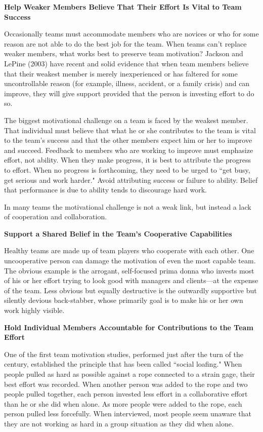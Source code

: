 \textbf{Help Weaker Members Believe That Their Effort Is Vital to Team Success}

Occasionally teams must accommodate members who are novices or who for some reason are not able to do the best job for the team. When teams can’t replace weaker members, what works best to preserve team motivation? Jackson and LePine (2003) have recent and solid evidence that when team members believe that their weakest member is merely inexperienced or has faltered for some uncontrollable reason (for example, illness, accident, or a family crisis) and can improve, they will give support provided that the person is investing effort to do so.

The biggest motivational challenge on a team is faced by the weakest member. That individual must believe that what he or she contributes to the team is vital to the team’s success and that the other members expect him or her to improve and succeed. Feedback to members who are working to improve must emphasize effort, not ability. When they make progress, it is best to attribute the progress to effort. When no progress is forthcoming, they need to be urged to ``get busy, get serious and work harder." Avoid attributing success or failure to ability. Belief that performance is due to ability tends to discourage hard work.

In many teams the motivational challenge is not a weak link, but instead a lack of cooperation and collaboration.

\textbf{Support a Shared Belief in the Team’s Cooperative Capabilities}

Healthy teams are made up of team players who cooperate with each other. One uncooperative person can damage the motivation of even the most capable team. The obvious example is the arrogant, self-focused prima donna who invests most of his or her effort trying to look good with managers and clients—at the expense of the team. Less obvious but equally destructive is the outwardly supportive but silently devious back-stabber, whose primarily goal is to make his or her own work highly visible.

\textbf{Hold Individual Members Accountable for Contributions to the Team Effort}

One of the first team motivation studies, performed just after the turn of the century, established the principle that has been called ``social loafing." When people pulled as hard as possible against a rope connected to a strain gage, their best effort was recorded. When another person was added to the rope and two people pulled together, each person invested less effort in a collaborative effort than he or she did when alone. As more people were added to the rope, each person pulled less forcefully. When interviewed, most people seem unaware that they are not working as hard in a group situation as they did when alone.

